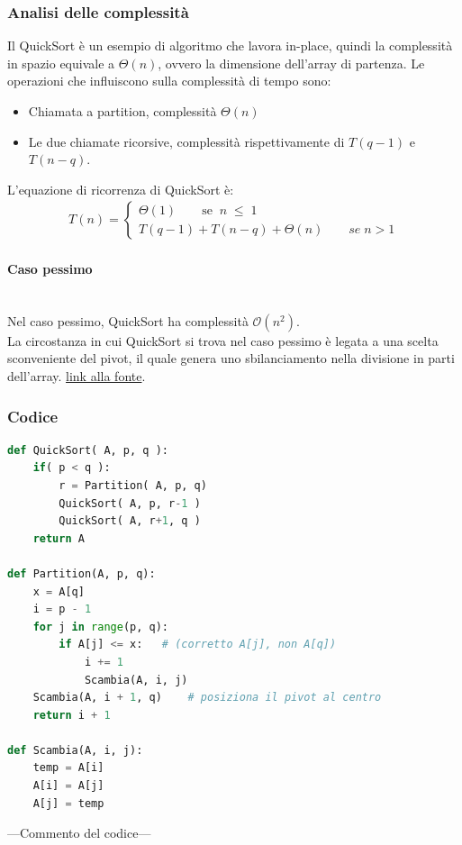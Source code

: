\documentclass[a4paper, 11pt]{article}
\begin{document}
\subsubsection{Analisi delle complessità}
Il QuickSort è un esempio di algoritmo che lavora in-place, quindi la complessità in spazio equivale a $\Theta(n)$, ovvero la dimensione dell'array di partenza.\bigbreak
\noindent Le operazioni che influiscono sulla complessità di tempo sono:
\begin{itemize}
    \item Chiamata a partition, complessità $\Theta(n)$
    \item Le due chiamate ricorsive, complessità rispettivamente di $T(q-1)$ e $T(n-q)$.
\end{itemize}


\noindent L'equazione di ricorrenza di QuickSort è:
\begin{gather*}
    T(n) = 
    \begin{cases}
    \Theta(1)\quad\quad \text{se}\;\; n\; \leq\; 1 \\
    T(q - 1) + T(n - q) + \Theta(n)\quad\quad se\; n > 1
    \end{cases}     
\end{gather*}
 
\paragraph{Caso pessimo}\mbox{}\\
Nel caso pessimo, QuickSort ha complessità $\mathcal{O}(n^2)$.\\
La circostanza in cui QuickSort si trova nel caso pessimo è legata a una scelta sconveniente del pivot, il quale genera uno sbilanciamento nella divisione in parti dell'array.
\href{https://ifif.altervista.org/quicksort-come-funziona-esempio/?doing_wp_cron=1750427062.2481169700622558593750}{\color{blue}link alla fonte}.

\subsubsection{Codice}
\begin{lstlisting}[style=mycodestyle, language=Python]
def QuickSort( A, p, q ):
    if( p < q ):
        r = Partition( A, p, q)
        QuickSort( A, p, r-1 )
        QuickSort( A, r+1, q )
    return A

def Partition(A, p, q):
    x = A[q]
    i = p - 1
    for j in range(p, q):
        if A[j] <= x:   # (corretto A[j], non A[q])
            i += 1
            Scambia(A, i, j)
    Scambia(A, i + 1, q)    # posiziona il pivot al centro
    return i + 1

def Scambia(A, i, j):
    temp = A[i]
    A[i] = A[j]
    A[j] = temp
\end{lstlisting}
---Commento del codice---
\end{document}
